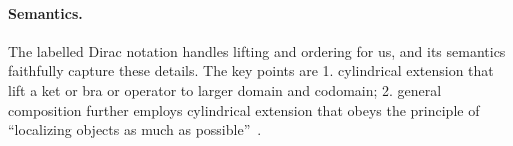 
\paragraph*{Semantics.} The labelled Dirac notation handles lifting and ordering for us, and its semantics faithfully capture these details. The key points are 1. cylindrical extension that lift a ket or bra or operator to larger domain and codomain; 2. general composition further employs cylindrical extension that obeys the principle of ``localizing objects as much as possible''~\cite{Zhou2023}.

